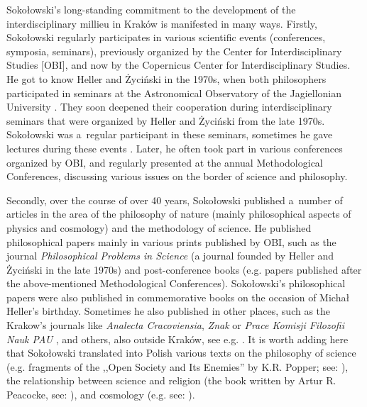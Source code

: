 \documentclass[%
  manuscript=article,
  year=2024,
  volume=77,
  doi=00000.000,
]{zfn}
\begin{document}
Sokołowski's long-standing commitment to the development of the interdisciplinary millieu in Kraków is manifested in many ways. Firstly, Sokołowski regularly participates in various scientific events (conferences, symposia, seminars), previously organized by the Center for Interdisciplinary Studies [OBI], and now by the Copernicus Center for Interdisciplinary Studies. He got to know Heller and Życiński in the 1970s, when both philosophers participated in seminars at the Astronomical Observatory of the Jagiellonian University 
\parencite[][]{Sokoowski2015Racjonalny}. %
 They soon deepened their cooperation during interdisciplinary seminars that were organized by Heller and Życiński from the late 1970s. Sokołowski was a~regular participant in these seminars, sometimes he gave lectures during these events 
\parencite[][]{Liana1999Z}. %
 Later, he often took part in various conferences organized by OBI, and regularly presented at the annual Methodological Conferences, discussing various issues on the border of science and philosophy.



Secondly, over the course of over 40 years, Sokołowski published a~number of articles in the area of the philosophy of nature (mainly philosophical aspects of physics and cosmology) and the methodology of science. He published philosophical papers mainly in various prints published by OBI, such as the journal \textit{Philosophical Problems in Science} (a journal founded by Heller and Życiński in the late 1970s) and post-conference books (e.g. papers published after the above-mentioned Methodological Conferences). Sokołowski's philosophical papers were also published in commemorative books on the occasion of Michał Heller's birthday. Sometimes he also published in other places, such as the Krakow's journals like \textit{Analecta Cracoviensia}, \textit{Znak} or \textit{Prace Komisji Filozofii Nauk PAU} 
\parencite[e.g.,][]{Sokoowski2008Uzasadnianie}, %
 and others, also outside Kraków, see e.g. 
\parencites[][]{Sokoowski1978Czy}[][]{Sokoowski1984O}[][]{Sokoowski1986Pluralizm}. %
 It is worth adding here that Sokołowski translated into Polish various texts on the philosophy of science (e.g. fragments of the ,,Open Society and Its Enemies'' by K.R. Popper; see: 
\parencite[][]{Popper1987Hegel}%
), the relationship between science and religion (the book written by Artur R. Peacocke, see: 
\parencite[][]{Peacocke1991Teologia}%
), and cosmology (e.g. see: 
\parencite[][]{Davies1996Zasada}%
).
\end{document}
